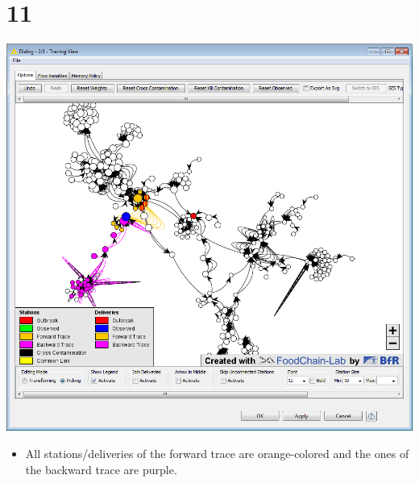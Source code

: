 \documentclass{beamer}
\begin{document}
\section{11}
\begin{frame}
	\begin{center}
  		\includegraphics[height=0.6\textheight]{11.png}
	\end{center}
	\begin{itemize}
		\item All stations/deliveries of the forward trace are orange-colored and the ones of the backward trace are purple.		
	\end{itemize}
\end{frame}
\end{document}
